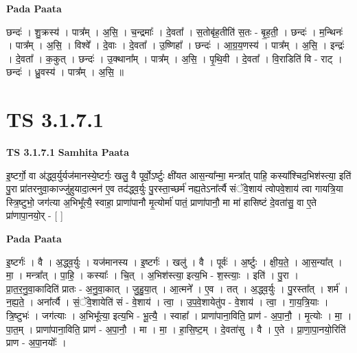 \documentclass[17pt]{extarticle}
\begin{document}
\textbf{Pada Paata} \newline

छन्दः॑ । शु॒क्रस्य॑ । पात्र᳚म् । अ॒सि॒ । च॒न्द्रमाः᳚ । दे॒वता᳚ । स॒तोबृ॑ह॒तीति॑ स॒तः - बृ॒ह॒ती॒ । छन्दः॑ । म॒न्थिनः॑ । पात्र᳚म् । अ॒सि॒ । विश्वे᳚ । दे॒वाः । दे॒वता᳚ । उ॒ष्णिहा᳚ । छन्दः॑ । आ॒ग्र॒य॒णस्य॑ । पात्र᳚म् । अ॒सि॒ । इन्द्रः॑ । दे॒वता᳚ । क॒कुत् । छन्दः॑ । उ॒क्थाना᳚म् । पात्र᳚म् । अ॒सि॒ । पृ॒थि॒वी । दे॒वता᳚ । वि॒राडिति॑ वि - राट् । छन्दः॑ । ध्रु॒वस्य॑ । पात्र᳚म् । अ॒सि॒ ॥  \newline





\section{ TS 3.1.7.1 }

\textbf{TS 3.1.7.1 } \newline
\textbf{Samhita Paata} \newline

इ॒ष्टर्गो॒ वा अ॑द्ध्व॒र्युर्यज॑मानस्ये॒ष्टर्गः॒ खलु॒ वै पूर्वो॒ऽर्ष्टुः क्षी॑यत आस॒न्या᳚न्मा॒ मन्त्रा᳚त् पाहि॒ कस्या᳚श्चिद॒भिश॑स्त्या॒ इति॑ पु॒रा प्रा॑तरनुवा॒काज्जु॑हुयादा॒त्मन॑ ए॒व तद॑द्ध्व॒र्युः पु॒रस्ता॒च्छर्म॑ नह्य॒तेऽना᳚र्त्यै संॅवे॒शाय॑ त्वोपवे॒शाय॑ त्वा गायत्रि॒या स्त्रि॒ष्टुभो॒ जग॑त्या अ॒भिभू᳚त्यै॒ स्वाहा॒ प्राणा॑पानौ मृ॒त्योर्मा॑ पातं॒ प्राणा॑पानौ॒ मा मा॑ हासिष्टं दे॒वता॑सु॒ वा ए॒ते प्रा॑णापा॒नयो॒र् - [  ] \newline

\textbf{Pada Paata} \newline

इ॒ष्टर्गः॑ । वै । अ॒द्ध्व॒र्युः । यज॑मानस्य । इ॒ष्टर्गः॑ । खलु॑ । वै । पूर्वः॑ । अ॒र्ष्टुः । क्षी॒य॒ते॒ । आ॒स॒न्या᳚त् । मा॒ । मन्त्रा᳚त् । पा॒हि॒ । कस्याः᳚ । चि॒त् । अ॒भिश॑स्त्या॒ इत्य॒भि - श॒स्त्याः॒ । इति॑ । पु॒रा । प्रा॒त॒र॒नु॒वा॒कादिति॑ प्रातः - अ॒नु॒वा॒कात् । जु॒हु॒या॒त् । आ॒त्मने᳚ । ए॒व । तत् । अ॒द्ध्व॒र्युः । पु॒रस्ता᳚त् । शर्म॑ । न॒ह्य॒ते॒ । अना᳚र्त्यै । सं॒ॅवे॒शायेति॑ सं - वे॒शाय॑ । त्वा॒ । उ॒प॒वे॒शायेतु॑प - वे॒शाय॑ । त्वा॒ । गा॒य॒त्रि॒याः । त्रि॒ष्टुभः॑ । जग॑त्याः । अ॒भिभू᳚त्या॒ इत्य॒भि - भू॒त्यै॒ । स्वाहा᳚ । प्राणा॑पाना॒विति॒ प्राण॑ - अ॒पा॒नौ॒ । मृ॒त्योः । मा॒ । पा॒त॒म् । प्राणा॑पाना॒विति॒ प्राण॑ - अ॒पा॒नौ॒ । मा । मा॒ । हा॒सि॒ष्ट॒म् । दे॒वता॑सु । वै । ए॒ते । प्रा॒णा॒पा॒नयो॒रिति॑ प्राण - अ॒पा॒नयोः᳚ ।  \newline
\end{document}
